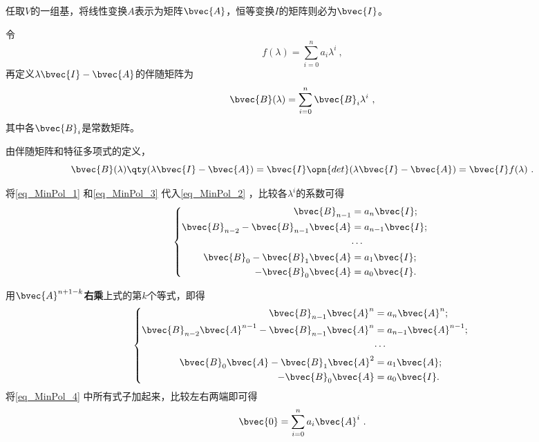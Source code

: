 任取$V$的一组基，将线性变换$A$表示为矩阵$\bvec{A}$，恒等变换$I$的矩阵则必为$\bvec{I}$。

令
\begin{equation}\label{eq_MinPol_1}
f(\lambda) = \sum_{i=0}^n a_i\lambda^i~, 
\end{equation}
再定义$\lambda\bvec{I}-\bvec{A}$的伴随矩阵为
\begin{equation}\label{eq_MinPol_3}
\bvec{B}(\lambda)=\sum_{i=0}^n \bvec{B}_i\lambda^i~, 
\end{equation}
其中各$\bvec{B}_i$是常数矩阵。

由伴随矩阵和特征多项式的定义，
\begin{equation}\label{eq_MinPol_2}
\bvec{B}(\lambda)\qty(\lambda\bvec{I}-\bvec{A}) = \bvec{I}\opn{det}(\lambda\bvec{I}-\bvec{A}) = \bvec{I}f(\lambda)~. 
\end{equation}

将\autoref{eq_MinPol_1} 和\autoref{eq_MinPol_3} 代入\autoref{eq_MinPol_2} ，比较各$\lambda^i$的系数可得
\begin{equation}
\left\{
\begin{aligned}
\bvec{B}_{n-1} ={}& a_n\bvec{I}; \\
\bvec{B}_{n-2}-\bvec{B}_{n-1}\bvec{A} ={}& a_{n-1}\bvec{I}; \\
\cdots{}&\\
\bvec{B}_{0}-\bvec{B}_{1}\bvec{A} ={}& a_1\bvec{I};\\
-\bvec{B}_{0}\bvec{A} ={}& a_0\bvec{I}. 
\end{aligned}
\right. ~
\end{equation}

用$\bvec{A}^{n+1-k}$\textbf{右乘}上式的第$k$个等式，即得
\begin{equation}\label{eq_MinPol_4}
\left\{
\begin{aligned}
\bvec{B}_{n-1} \bvec{A}^n={}& a_n\bvec{A}^n; \\
\bvec{B}_{n-2}\bvec{A}^{n-1}-\bvec{B}_{n-1}\bvec{A}^n ={}& a_{n-1}\bvec{A}^{n-1}; \\
\cdots{}&\\
\bvec{B}_{0}\bvec{A}-\bvec{B}_{1}\bvec{A}^2 ={}& a_1\bvec{A};\\
-\bvec{B}_{0}\bvec{A} ={}& a_0\bvec{I}. 
\end{aligned}
\right. ~
\end{equation}
将\autoref{eq_MinPol_4} 中所有式子加起来，比较左右两端即可得
\begin{equation}
\bvec{0} = \sum_{i=0}^n a_i\bvec{A}^i~. 
\end{equation}

